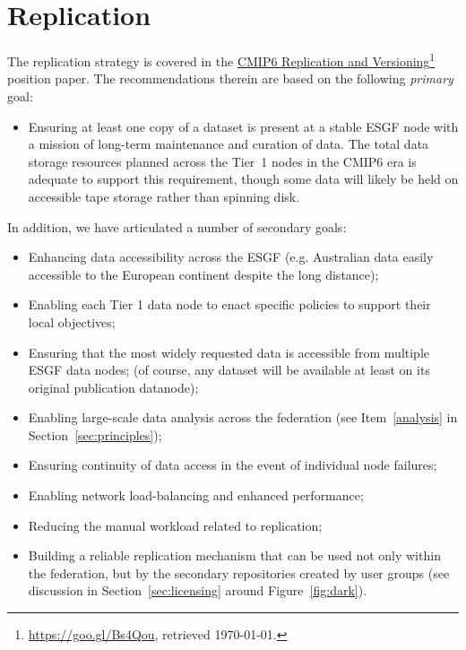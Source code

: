 \documentclass[gmd,manuscript]{copernicus}
\newcommand{\pllabel}[1]{\label{p-#1}\linelabel{l-#1}}
\newcommand{\urlref}[2] {\href{#1}{#2}\footnote{\url{#1}, retrieved \today.}}
\begin{document}
\section{Replication}
\label{sec:replica}

\pllabel{RC3-21}
The replication strategy is covered in the
\urlref{https://goo.gl/Bs4Qou}{CMIP6 Replication and Versioning}
position paper. The recommendations therein are based on the following
\emph{primary} goal:

\begin{itemize}
\item Ensuring at least one copy of a dataset is present at a stable
  ESGF node with a mission of long-term maintenance and curation of
  data. The total data storage resources planned across the Tier~1
  nodes in the CMIP6 era is adequate to support this requirement,
  though some data will likely be held on accessible tape storage
  rather than spinning disk.
\end{itemize}

In addition, we have articulated a number of secondary goals:

\begin{itemize}
\item Enhancing data accessibility across the ESGF (e.g. Australian
  data easily accessible to the European continent despite the long
  distance);
\item Enabling each Tier 1 data node to enact specific policies to
  support their local objectives;
\item Ensuring that the most widely requested data is 
  accessible from multiple ESGF data nodes;
  \pllabel{RC1-58}
  (of course, any dataset will be available at least on its original
  publication datanode);
\item Enabling large-scale data analysis across the federation (see
  Item~\ref{analysis} in Section~\ref{sec:principles});
\item Ensuring continuity of data access in the event of individual
  node failures;
\item Enabling network load-balancing and enhanced performance;
\item Reducing the manual workload related to replication;
\item Building a reliable replication mechanism that can be used not
  only within the federation, but by the secondary repositories
  created by user groups (see discussion in
  Section~\ref{sec:licensing} around Figure~\ref{fig:dark}).
\end{itemize}
\end{document}
